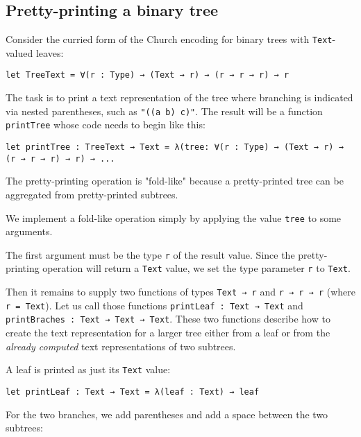 \subsection{Pretty-printing a binary tree}


Consider the curried form of the Church encoding for binary trees with \lstinline!Text!-valued leaves:


\begin{lstlisting}[language=Dhall]
let TreeText = ∀(r : Type) → (Text → r) → (r → r → r) → r
\end{lstlisting}


The task is to print a text representation of the tree where branching is indicated via nested parentheses, such as \lstinline!"((a b) c)"!.
The result will be a function \lstinline!printTree! whose code needs to begin like this:


\begin{lstlisting}[language=Dhall]
let printTree : TreeText → Text = λ(tree: ∀(r : Type) → (Text → r) → (r → r → r) → r) → ...
\end{lstlisting}


The pretty-printing operation is "fold-like" because a pretty-printed tree can be aggregated from pretty-printed subtrees.


We implement a fold-like operation simply by applying the value \lstinline!tree! to some arguments.


The first argument must be the type \lstinline!r! of the result value.
Since the pretty-printing operation will return a \lstinline!Text! value, we set the type parameter \lstinline!r! to \lstinline!Text!.


Then it remains to supply two functions of types \lstinline!Text → r! and \lstinline!r → r → r! (where \lstinline!r = Text!).
Let us call those functions \lstinline!printLeaf : Text → Text! and \lstinline!printBraches : Text → Text → Text!.
These two functions describe how to create the text representation for a larger tree either from a leaf or from the \emph{already computed} text representations of two subtrees.


A leaf is printed as just its \lstinline!Text! value:


\begin{lstlisting}[language=Dhall]
let printLeaf : Text → Text = λ(leaf : Text) → leaf
\end{lstlisting}


For the two branches, we add parentheses and add a space between the two subtrees:


